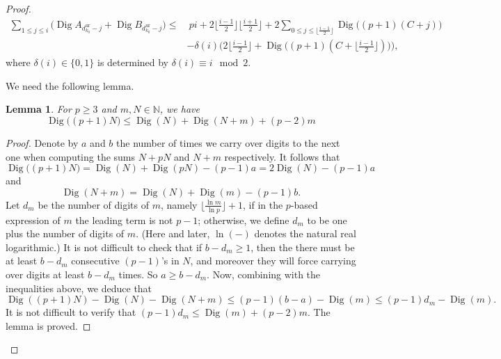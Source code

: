 \documentclass[12pt]{amsart}
\newtheorem{lemma}[subsection]{Lemma}
\theoremstyle{definition}
\numberwithin{equation}{subsection}
\DeclareMathOperator{\Dig}{Dig}
\newcommand{\unr}{\mathrm{ur}}
\begin{document}
\begin{proof}
\begin{align}
\label{E:diga+digb}
\displaystyle \sum_{1 \leq j \leq i}{\big( \Dig A_{d_{k_0}^\unr - j} +\Dig B_{d_{k_0}^\unr-j}}\big) \leq &\ pi + 2\lfloor\tfrac{i-1}{2}\rfloor\lfloor\tfrac{i+1}{2}\rfloor+ 2\displaystyle \sum_{0 \leq j \leq \lfloor\frac{i-1}{2}\rfloor}{\Dig \big((p+1)(C+j)\big)}\\
\nonumber
&- \delta(i)\big(2\lfloor\tfrac{i-1}{2}\rfloor+\Dig \big((p+1)(C+\lfloor\tfrac{i-1}{2}\rfloor)\big)\big),
\end{align}
where $\delta(i)\in\{0,1\}$ is determined by $\delta(i)\equiv i\mod 2$. 

We need the following lemma.

\begin{lemma}
	\label{Diglemma}
	For $p\geq3$ and $m,N \in \mathbb{N}$,  we have
	\[
	\Dig\big((p+1)N \big) \leq \Dig(N)+ \Dig(N+m)+(p-2)m 
	\]
\end{lemma}
\begin{proof}
Denote by $a$ and $b$ the number of times we carry over digits to the next one when computing the sums $N+pN$ and $N+m$ respectively. It follows that
\[
\Dig\big((p+1)N \big)=\Dig(N)+\Dig(pN)-(p-1)a=2\Dig(N)-(p-1)a
\]
and
\[
\Dig(N+m)=\Dig(N)+\Dig(m)-(p-1)b.
\]
Let $d_m$ be the number of digits of $m$, namely $\lfloor\frac{\ln m}{\ln p}\rfloor+1$, if in the $p$-based expression of $m$ the leading term is not $p-1$; otherwise, we define $d_m$ to be one plus the number of digits of $m$. (Here and later, $\ln(-)$ denotes the natural real logarithmic.) It is not difficult to check that if $b-d_m \geq 1$, then the there must be at least $b-d_m$ consecutive $(p-1)$'s in $N$, and moreover they will force carrying over digits at least $b-d_m$ times. So $a \geq b-d_m$. 
Now, combining with the inequalities above, we deduce that
$$
\Dig((p+1)N) - \Dig(N) -\Dig(N+m) \leq (p-1)(b-a)-\Dig(m) \leq  (p-1)d_m -\Dig(m).
$$
It is not difficult to verify that $(p-1)d_m \leq \Dig(m) + (p-2)m$. The lemma is proved.
\end{proof}


\end{proof}
\end{document}
